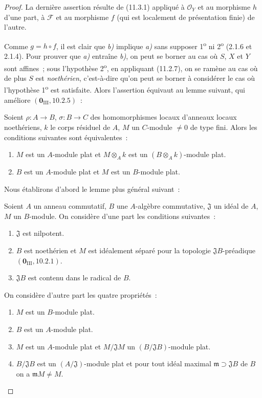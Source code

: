 \begin{proof}
La dernière assertion résulte de (11.3.1) appliqué à $\mathcal O_Y$ et au
morphisme $h$ d'une part, à $\mathcal F$ et au morphisme $f$ (qui est
localement de présentation finie) de l'autre.

Comme $g=h\circ f$, il est clair que \emph{b)} implique \emph{a)} sans supposer
1\textsuperscript{o} ni 2\textsuperscript{o} (2.1.6 et 2.1.4). Pour prouver que
\emph{a)} entraîne \emph{b)}, on peut se borner au cas où $S$, $X$ et $Y$ sont affines~;
sous l'hypothèse 2\textsuperscript{o}, en appliquant (11.2.7), on se ramène au
cas où de plus $S$ est \emph{noethérien}, c'est-à-dire qu'on peut se borner à
considérer le cas où l'hypothèse 1\textsuperscript{o} est satisfaite. Alors
l'assertion équivaut au lemme suivant, qui améliore
$(\mathbf 0_{\mathrm{III}},10.2.5)$~:

\begin{lemma}[11.3.10.1]
\label{IV.11.3.10.1-fr}
Soient $\rho:A\to B$, $\sigma:B\to C$ des homomorphismes locaux d'anneaux
locaux noethériens, $k$ le corps résiduel de $A$, $M$ un $C$-module
$\neq0$ de type fini. Alors les conditions suivantes sont équivalentes~:
\begin{enumerate}[label=\emph{\alph*)}]
\item $M$ est un $A$-module plat et $M\otimes_Ak$ est un
$(B\otimes_Ak)$-module plat.
\item $B$ est un $A$-module plat et $M$ est un $B$-module plat.
\end{enumerate}
\end{lemma}

Nous établirons d'abord le lemme plus général suivant~:

\begin{lemma}[11.3.10.2]
\label{IV.11.3.10.2-fr}
Soient $A$ un anneau commutatif, $B$ une $A$-algèbre commutative,
$\mathfrak J$ un idéal de $A$, $M$ un $B$-module. On considère d'une part les
conditions suivantes~:
\begin{enumerate}[label=\emph{(\roman*)}]
\item $\mathfrak J$ est nilpotent.
\item $B$ est noethérien et $M$ est idéalement séparé pour la topologie
$\mathfrak JB$-préadique $(\mathbf 0_{\mathrm{III}},10.2.1)$.
\item $\mathfrak JB$ est contenu dans le radical de $B$.
\end{enumerate}
On considère d'autre part les quatre propriétés~:
\begin{enumerate}[label=\emph{\alph*)}]
\item $M$ est un $B$-module plat.
\item $B$ est un $A$-module plat.
\item $M$ est un $A$-module plat et $M/\mathfrak JM$ un
$(B/\mathfrak JB)$-module plat.
\item $B/\mathfrak JB$ est un $(A/\mathfrak J)$-module plat et pour tout idéal
maximal $\mathfrak m\supset\mathfrak JB$ de $B$ on a $\mathfrak mM\neq M$.
\end{enumerate}


\end{lemma}
\end{proof}
